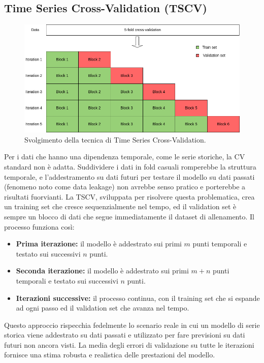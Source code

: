 \documentclass[a4paper,12pt]{report}
\begin{document}
	\subsection{Time Series Cross-Validation (TSCV)}
	\begin{figure}[H]
		\centering
		\includegraphics[width=1.0\textwidth]{img/tscv.png}
		\caption{Svolgimento della tecnica di Time Series Cross-Validation.}
	\end{figure}
	Per i dati che hanno una dipendenza temporale, come le serie storiche, la CV standard non è adatta. Suddividere i dati in fold casuali romperebbe la struttura temporale, e l'addestramento su dati futuri per testare il modello su dati passati (fenomeno noto come data leakage) non avrebbe senso pratico e porterebbe a risultati fuorvianti. La TSCV, sviluppata per risolvere questa problematica, crea un training set che cresce sequenzialmente nel tempo, ed il validation set è sempre un blocco di dati che segue immediatamente il dataset di allenamento. Il processo funziona così:
	\begin{itemize}
		\item \textbf{Prima iterazione:} il modello è addestrato sui primi $m$ punti temporali e testato sui successivi $n$ punti.
		\item \textbf{Seconda iterazione:} il modello è addestrato sui primi $m+n$ punti temporali e testato sui successivi $n$ punti.
		\item \textbf{Iterazioni successive:} il processo continua, con il training set che si espande ad ogni passo ed il validation set che avanza nel tempo.
	\end{itemize}
	Questo approccio rispecchia fedelmente lo scenario reale in cui un modello di serie storica viene addestrato su dati passati e utilizzato per fare previsioni su dati futuri non ancora visti. La media degli errori di validazione su tutte le iterazioni fornisce una stima robusta e realistica delle prestazioni del modello.
	
\end{document}
